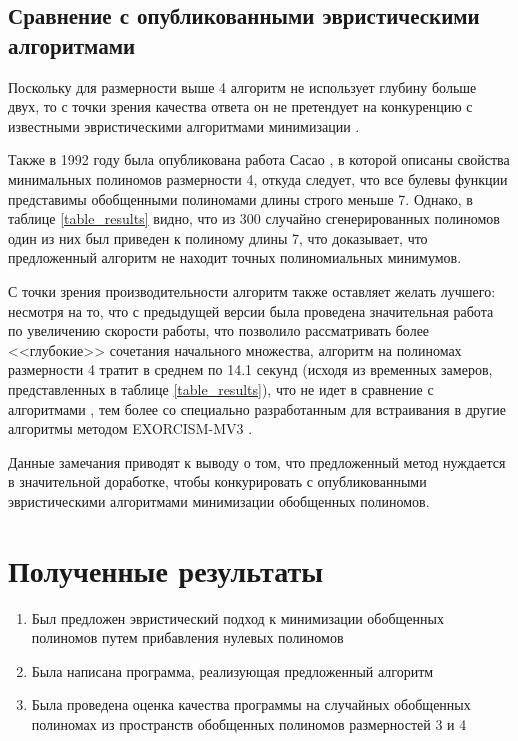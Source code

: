 \documentclass[a4paper,12pt,titlepage]{article}
\begin{document}
\subsection{Сравнение с опубликованными эвристическими алгоритмами}

Поскольку для размерности выше 4 алгоритм не использует глубину больше двух, то с точки зрения качества ответа он не претендует на конкуренцию с известными эвристическими алгоритмами минимизации \cite{exmin2, exorcism4, exorcism-mv3, grmin2}.

Также в 1992 году была опубликована работа Сасао \cite{4var-min}, в которой описаны свойства минимальных полиномов размерности 4, откуда следует, что все булевы функции представимы обобщенными полиномами длины строго меньше 7. Однако, в таблице \ref{table_results} видно, что из 300 случайно сгенерированных полиномов один из них был приведен к полиному длины 7, что доказывает, что предложенный алгоритм не находит точных полиномиальных минимумов.

С точки зрения производительности алгоритм также оставляет желать лучшего: несмотря на то, что с предыдущей версии была проведена значительная работа по увеличению скорости работы, что позволило рассматривать более <<глубокие>> сочетания начального множества, алгоритм на полиномах размерности 4 тратит в среднем по 14.1 секунд (исходя из временных замеров, представленных в таблице \ref{table_results}), что не идет в сравнение с алгоритмами \cite{exmin2, exorcism4, grmin2}, тем более со специально разработанным для встраивания в другие алгоритмы методом \textsc{EXORCISM-MV3} \cite{exorcism-mv3}.

Данные замечания приводят к выводу о том, что предложенный метод нуждается в значительной доработке, чтобы конкурировать с опубликованными эвристическими алгоритмами минимизации обобщенных полиномов.

\section{Полученные результаты}

\begin{enumerate}
    \item Был предложен эвристический подход к минимизации обобщенных полиномов путем прибавления нулевых полиномов
    \item Была написана программа, реализующая предложенный алгоритм
    \item Была проведена оценка качества программы на случайных обобщенных полиномах из пространств обобщенных полиномов размерностей 3 и 4
\end{enumerate}
\end{document}

